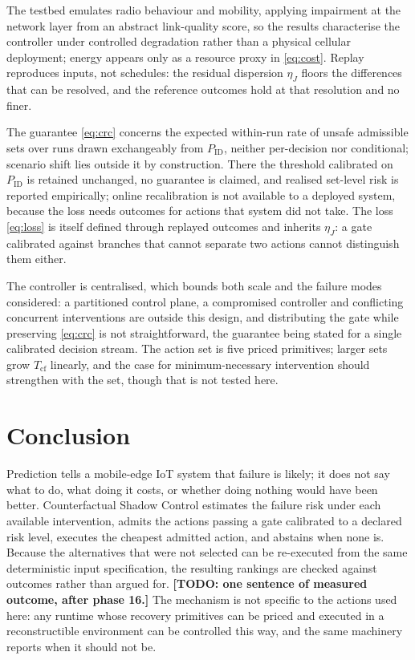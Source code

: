 \documentclass[journal]{IEEEtran}
\newcommand{\TODO}[1]{\textbf{[TODO: #1]}}
\begin{document}
The testbed emulates radio behaviour and mobility, applying impairment at the
network layer from an abstract link-quality score, so the results characterise
the controller under controlled degradation rather than a physical cellular
deployment; energy appears only as a resource proxy in \eqref{eq:cost}. Replay
reproduces inputs, not schedules: the residual dispersion $\eta_J$ floors the
differences that can be resolved, and the reference outcomes hold at that
resolution and no finer.

The guarantee \eqref{eq:crc} concerns the expected within-run rate of unsafe
admissible sets over runs drawn exchangeably from $P_{\mathrm{ID}}$, neither
per-decision nor conditional; scenario shift lies outside it by construction.
There the threshold calibrated on
$P_{\mathrm{ID}}$ is retained unchanged, no guarantee is claimed, and realised
set-level risk is reported empirically; online recalibration is not available to
a deployed system, because the loss needs outcomes for actions that system did
not take. The loss \eqref{eq:loss} is itself defined through replayed outcomes
and inherits $\eta_J$: a gate calibrated against branches that cannot separate
two actions cannot distinguish them either.

The controller is centralised, which bounds both scale and the failure modes
considered: a partitioned control plane, a compromised controller and
conflicting concurrent interventions are outside this design, and distributing
the gate while preserving \eqref{eq:crc} is not straightforward, the guarantee
being stated for a single calibrated decision stream. The action set is five
priced primitives; larger sets grow $T_{\mathrm{cf}}$ linearly, and the case for
minimum-necessary intervention should strengthen with the set, though that is
not tested here.

\section{Conclusion}

Prediction tells a mobile-edge IoT system that failure is likely; it does not
say what to do, what doing it costs, or whether doing nothing would have been
better. Counterfactual Shadow Control estimates the failure risk under each
available intervention, admits the actions passing a gate calibrated to a
declared risk level, executes the cheapest admitted action, and abstains when
none is. Because the alternatives that were not selected can be re-executed from
the same deterministic input specification, the resulting rankings are checked against outcomes rather
than argued for. \TODO{one sentence of measured outcome, after
phase 16.} The mechanism is not specific to the actions used here: any runtime
whose recovery primitives can be priced and executed in a reconstructible
environment can be controlled this way, and the same machinery reports when it
should not be.



\end{document}
